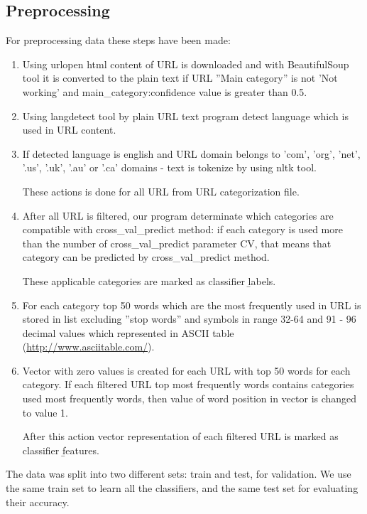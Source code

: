 \documentclass{article} %
\begin{document}
\subsection{Preprocessing}

 For preprocessing data these steps have been made:
 
 \begin{enumerate}
 	
	 	\item Using urlopen html content of URL is downloaded and with BeautifulSoup tool it is converted to the plain text if URL ''Main category'' is not 'Not working' and main\_category:confidence value is greater than 0.5.
 	\item Using langdetect tool by plain URL text program detect language which is used in URL content.
 	\item If detected language is english and URL domain belongs to 'com', 'org', 'net', '.us', '.uk', '.au' or '.ca' domains - text is tokenize by using nltk tool. 
 	
 	These actions is done for all URL from URL categorization file.
 	
 	\item After all URL is filtered, our program determinate which categories are compatible with cross\_val\_predict method: if each category is used more than the number of cross\_val\_predict parameter CV, that means that category can be predicted by cross\_val\_predict method.
 	
 	These applicable categories are marked as classifier \b{labels}.
 	
 	\item For each category top 50 words which are the most frequently used in URL is stored in list excluding ''stop words'' and symbols in range 32-64 and 91 - 96 decimal values which represented in ASCII table (\href{http://www.asciitable.com/}{http://www.asciitable.com/}).
 	
 	\item Vector with zero values is created for each URL with top 50 words for each category. If each filtered URL top most frequently words contains categories used most frequently words, then value of word position in vector is changed to value 1.
 	
 	After this action vector representation of each filtered URL is marked as classifier \b{features}.
 	
 \end{enumerate} 
	
  The data was split into two different sets: train and test, for validation. We use the same train set to learn all the classifiers, and the same test set for evaluating their accuracy.
\end{document}
